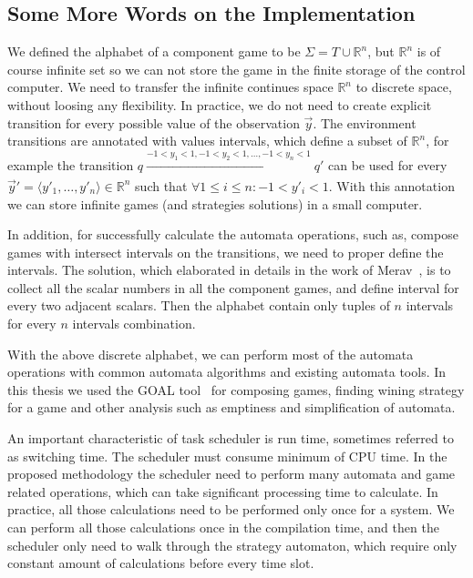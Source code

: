 \documentclass[ twoside, 12pt ]{article}
\newcommand\R{{\mathbb R}}
\begin{document}
\subsection{Some More Words on the Implementation}

We defined the alphabet of a component game to be $\Sigma = T \cup \R^n$, but $\R^n$ is of course infinite set so we can not store the game in the finite storage of the control computer.
We need to transfer the infinite continues space $\R^n$ to discrete space, without loosing any flexibility.
In practice, we do not need to create explicit transition for every possible value of the observation $\vec{y}$.
The environment transitions are annotated with values intervals, which define a subset of $\R^n$, for example the transition $q \xrightarrow[]{-1<y_1<1, -1<y_2<1, \dots , -1<y_n<1 } q'$ can be used for every $\vec{y}' = \langle y'_1, \dots , y'_n \rangle \in \R^n$ such that $\forall 1 \le i \le n : -1 < y'_i < 1$.
With this annotation we can store infinite games (and strategies solutions) in a small computer.

In addition, for successfully calculate the automata operations, such as, compose games with intersect intervals on the transitions, we need to proper define the intervals.
The solution, which elaborated in details in the work of Merav~\cite{Merav}, is to collect all the scalar numbers in all the component games, and define interval for every two adjacent scalars. Then the alphabet contain only tuples of $n$ intervals for every $n$ intervals combination. 


With the above discrete alphabet, we can perform most of the automata operations with common automata algorithms and existing automata tools. 
In this thesis we used the GOAL tool~\cite{goal} for composing games, finding wining strategy for a game and other analysis such as emptiness and simplification of automata.

An important characteristic of task scheduler is run time, sometimes referred to as switching time.
The scheduler must consume minimum of CPU time. In the proposed methodology the scheduler need to perform many automata and game related operations, which can take significant processing time to calculate.
In practice, all those calculations need to be performed only once for a system. 
We can perform all those calculations once in the compilation time, and then the scheduler only need to walk through the strategy automaton, which require only constant amount of calculations before every time slot.
\end{document}
